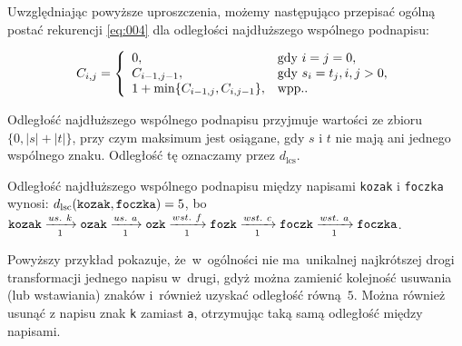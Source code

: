 \documentclass{praca1}
\begin{document}
\begin{definition}
Uwzględniając powyższe uproszczenia, możemy następująco przepisać ogólną postać rekurencji \eqref{eq:004} dla odległości najdłuższego wspólnego podnapisu:

\begin{equation*}
C_{i,j} = \left\{
\begin{array}{l l}     
    0, & \text{gdy } i = j = 0, \\
    C_{i-1, j-1}, & \text{gdy } s_i = t_j, i, j > 0,  \\
    1 + \min\{C_{i-1, j}, C_{i, j-1}\}, & \text{wpp.}. \\    
\end{array}\right.
\end{equation*}
\end{definition}


Odległość najdłuższego wspólnego podnapisu przyjmuje wartości ze zbioru $\{0, |s|+|t|\}$, przy czym maksimum jest osiągane, gdy $s$ i $t$ nie mają ani jednego wspólnego znaku. Odległość tę oznaczamy przez $d_{\mathrm{lcs}}$.

\begin{example}
Odległość najdłuższego wspólnego podnapisu między napisami \verb|kozak| i \verb|foczka| wynosi: $d_{\mathrm{lsc}}(\verb|kozak|, \verb|foczka|) = 5$, bo~$\verb|kozak|\xrightarrow[1]{us.\ k} \verb|ozak| \xrightarrow[1]{us.\ a} \verb|ozk| \xrightarrow[1]{wst.\ f} \verb|fozk| \xrightarrow[1]{wst.\ c} \verb|foczk| \xrightarrow[1]{wst.\ a} \verb|foczka|$.
\end{example}

Powyższy przykład pokazuje, że~w~ogólności nie ma~unikalnej najkrótszej drogi transformacji jednego napisu w~drugi, gdyż można zamienić kolejność usuwania (lub wstawiania) znaków i~również uzyskać odległość równą~$5$. Można również usunąć z napisu znak \verb|k| zamiast \verb|a|, otrzymując taką samą odległość między napisami.
\end{document}
